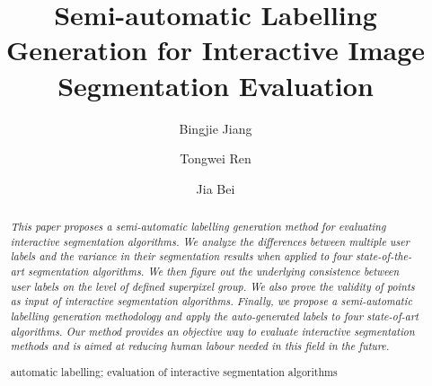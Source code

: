 \documentclass[runningheads,a4paper]{llncs}
\newcommand{\keywords}[1]{\par\addvspace\baselineskip
\noindent\keywordname\enspace\ignorespaces#1}
\begin{document}
\mainmatter  %

\title{Semi-automatic Labelling Generation for Interactive Image Segmentation Evaluation}


%
%
\author{Bingjie Jiang \and Tongwei Ren \and Jia Bei}
%


\maketitle


\begin{abstract}
\emph{This paper proposes a semi-automatic labelling generation method for evaluating interactive segmentation algorithms. We analyze the differences between multiple user labels and the variance in their segmentation results when applied to four state-of-the-art segmentation algorithms. We then figure out the underlying consistence between user labels on the level of defined superpixel group. We also prove the validity of points as input of interactive segmentation algorithms. Finally, we propose a semi-automatic labelling generation methodology and apply the auto-generated labels to four state-of-art algorithms. Our method provides an objective way to evaluate interactive segmentation methods and is aimed at reducing human labour needed in this field in the future.
}

\keywords{automatic labelling; evaluation of interactive segmentation algorithms}
\end{abstract}
\end{document}

